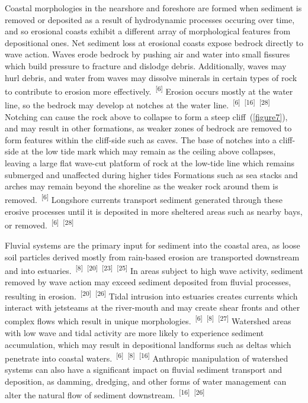 \documentclass{article}
\begin{document}
\par{Coastal morphologies in the nearshore and foreshore are formed when sediment is removed or deposited as a result of hydrodynamic processes occuring over time, and so erosional coasts exhibit a different array of morphological features from depositional ones. Net sediment loss at erosional coasts expose bedrock directly to wave action. Waves erode bedrock by pushing air and water into small fissures which build pressure to fracture and dislodge debris. Additionally, waves may hurl debris, and water from waves may dissolve minerals in certain types of rock to contribute to erosion more effectively.~\textsuperscript{[6]} Erosion occurs mostly at the water line, so the bedrock may develop at notches at the water line.~\textsuperscript{[6]}~\textsuperscript{[16]}~\textsuperscript{[28]} Notching can cause the rock above to collapse to form a steep cliff~(\cref{figure7}), and may result in other formations, as weaker zones of bedrock are removed to form features within the cliff-side such as caves. The base of notches into a cliff-side at the low tide mark which may remain as the ceiling above collapses, leaving a large flat wave-cut platform of rock at the low-tide line which remains submerged and unaffected during higher tides Formations such as sea stacks and arches may remain beyond the shoreline as the weaker rock around them is removed.~\textsuperscript{[6]} Longshore currents transport sediment generated through these erosive processes until it is deposited in more sheltered areas such as nearby bays, or removed.~\textsuperscript{[6]}~\textsuperscript{[28]} }

\par{Fluvial systems are the primary input for sediment into the coastal area, as loose soil particles derived mostly from rain-based erosion are transported downstream and into estuaries.~\textsuperscript{[8]}~\textsuperscript{[20]}~\textsuperscript{[23]}~\textsuperscript{[25]} In areas subject to high wave activity, sediment removed by wave action may exceed sediment deposited from fluvial processes, resulting in erosion.~\textsuperscript{[20]}~\textsuperscript{[26]} Tidal intrusion into estuaries creates currents which interact with jetsteams at the river-mouth and may create shear fronts and other complex flows which result in unique morphologies.~\textsuperscript{[6]}~\textsuperscript{[8]}~\textsuperscript{[27]} Watershed areas with low wave and tidal activity are more likely to experience sediment accumulation, which may result in depositional landforms such as deltas which penetrate into coastal waters.~\textsuperscript{[6]}~\textsuperscript{[8]}~\textsuperscript{[16]} Anthropic manipulation of watershed systems can also have a significant impact on fluvial sediment transport and deposition, as damming, dredging, and other forms of water management can alter the natural flow of sediment downstream.~\textsuperscript{[16]}~\textsuperscript{[26]}}
\end{document}
